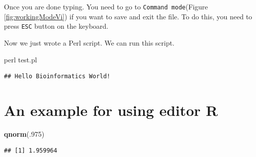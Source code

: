 \documentclass[]{book}
\makeatletter
\newenvironment{Shaded}{\begin{snugshade}}{\end{snugshade}}
\newcommand{\DecValTok}[1]{\textcolor[rgb]{0.00,0.00,0.81}{#1}}
\newcommand{\FunctionTok}[1]{\textcolor[rgb]{0.00,0.00,0.00}{#1}}
\newcommand{\KeywordTok}[1]{\textcolor[rgb]{0.13,0.29,0.53}{\textbf{#1}}}
\newcommand{\NormalTok}[1]{#1}
\newenvironment{kframe}{%
\medskip{}
\setlength{\fboxsep}{.8em}
 \def\at@end@of@kframe{}%
 \ifinner\ifhmode%
  \def\at@end@of@kframe{\end{minipage}}%
  \begin{minipage}{\columnwidth}%
 \fi\fi%
 \def\FrameCommand##1{\hskip\@totalleftmargin \hskip-\fboxsep
 \colorbox{shadecolor}{##1}\hskip-\fboxsep
     \hskip-\linewidth \hskip-\@totalleftmargin \hskip\columnwidth}%
 \MakeFramed {\advance\hsize-\width
   \@totalleftmargin\z@ \linewidth\hsize
   \@setminipage}}%
 {\par\unskip\endMakeFramed%
 \at@end@of@kframe}
\renewenvironment{Shaded}{\begin{kframe}}{\end{kframe}}
\makeatother
\begin{document}
Once you are done typing. You need to go to \texttt{Command\ mode}(Figure \ref{fig:workingModeVi}) if you want to save and exit the file. To do this, you need to press \texttt{ESC} button on the keyboard.

Now we just wrote a Perl script. We can run this script.

\begin{Shaded}
\begin{Highlighting}[]

\FunctionTok{perl}\NormalTok{ test.pl}
\end{Highlighting}
\end{Shaded}

\begin{verbatim}
## Hello Bioinformatics World!
\end{verbatim}

\hypertarget{an-example-for-using-editor-r}{%
\section{An example for using editor R}\label{an-example-for-using-editor-r}}

\begin{Shaded}
\begin{Highlighting}[]
\KeywordTok{qnorm}\NormalTok{(.}\DecValTok{975}\NormalTok{)}
\end{Highlighting}
\end{Shaded}

\begin{verbatim}
## [1] 1.959964
\end{verbatim}
\end{document}
